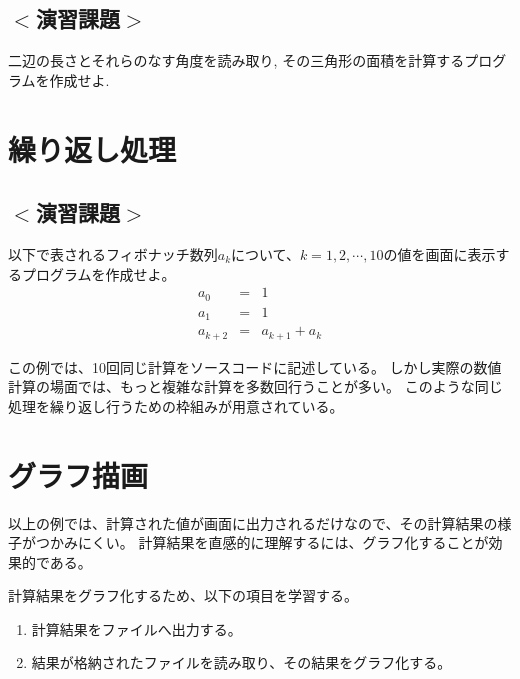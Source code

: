 \documentclass[a4j]{jsbook}
\begin{document}
\subsection*{$<$演習課題$>$}
二辺の長さとそれらのなす角度を読み取り, その三角形の面積を計算するプログラムを作成せよ. \\

\section{繰り返し処理}
\subsection*{$<$演習課題$>$}
以下で表されるフィボナッチ数列$a_k$について、$k=1,2, \cdots, 10$の値を画面に表示するプログラムを作成せよ。 \\
\begin{eqnarray}
a_0 &=& 1 \\
a_1 &=& 1 \\
a_{k+2} &=& a_{k+1} + a_k
\end{eqnarray}

この例では、10回同じ計算をソースコードに記述している。
しかし実際の数値計算の場面では、もっと複雑な計算を多数回行うことが多い。
このような同じ処理を繰り返し行うための枠組みが用意されている。




%

\section{グラフ描画}
以上の例では、計算された値が画面に出力されるだけなので、その計算結果の様子がつかみにくい。
計算結果を直感的に理解するには、グラフ化することが効果的である。

計算結果をグラフ化するため、以下の項目を学習する。
\begin{enumerate}
	\item 計算結果をファイルへ出力する。
	\item 結果が格納されたファイルを読み取り、その結果をグラフ化する。
\end{enumerate}
\end{document}
